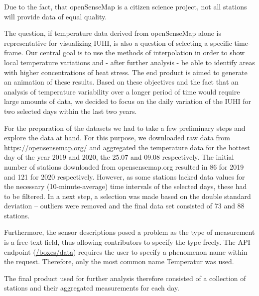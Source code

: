 Due to the fact, that openSenseMap is a citizen science project, not all stations will provide data of equal quality.

The question, if temperature data derived from openSenseMap alone is representative for visualizing IUHI, is also a question of selecting a specific time-frame. Our central goal is to use the methods of interpolation in order to show local temperature variations and - after further analysis - be able to identify areas with higher concentrations of heat stress. The end product is aimed to generate an animation of these results. Based on these objectives and the fact that an analysis of temperature variability over a longer period of time would require large amounts of data, we decided to focus on the daily variation of the IUHI for two selected days within the last two years.

For the preparation of the datasets we had to take a few preliminary steps and explore the data at hand. For this purpose, we downloaded raw data from \url{https://opensensemap.org/} and aggregated the temperature data for the hottest day of the year 2019 and 2020, the 25.07 and 09.08 respectively. The initial number of stations downloaded from opensensemap.org resulted in 86 for 2019 and 121 for 2020 respectively. However, as some stations lacked data values for the necessary (10-minute-average) time intervals of the selected days, these had to be filtered. In a next step, a selection was made based on the double standard deviation – outliers were removed and the final data set consisted of 73 and 88 stations.

Furthermore, the sensor descriptions posed a problem as the type of measurement is a free-text field, thus allowing contributors to specify the type freely. The API endpoint (\url{/boxes/data}) requires the user to specify a phenomenon name within the request. Therefore, only the most common name \ldq{}Temperatur\rdq{} was used.

The final product used for further analysis therefore consisted of a collection of stations and their aggregated measurements for each day.



